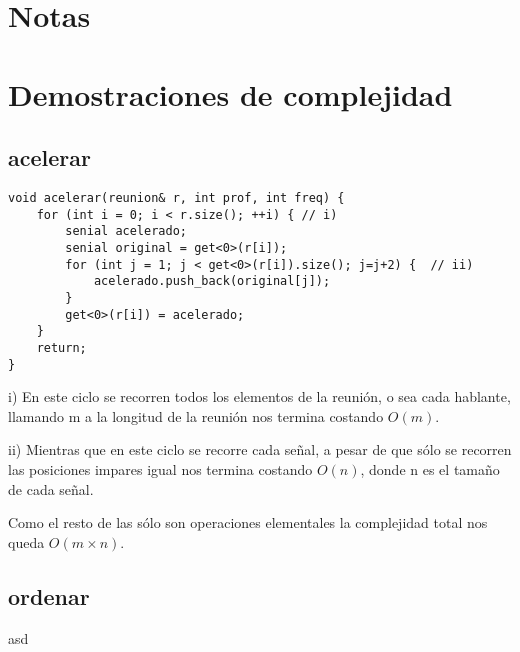 \documentclass{article}
\begin{document}
\maketitle

\tableofcontents
\newpage



\section*{Notas}
\vspace{0.5cm}


\newpage
{}
\section*{Demostraciones de complejidad}
\vspace{0.5cm}
\subsection{acelerar}
\begin{lstlisting}
void acelerar(reunion& r, int prof, int freq) {
    for (int i = 0; i < r.size(); ++i) { // i)
        senial acelerado;
        senial original = get<0>(r[i]);
        for (int j = 1; j < get<0>(r[i]).size(); j=j+2) {  // ii)
            acelerado.push_back(original[j]);
        }
        get<0>(r[i]) = acelerado;
    }
    return; 
}
\end{lstlisting}
i) En este ciclo se recorren todos los elementos de la reunión, o sea cada hablante, llamando m a la longitud de la reunión nos termina costando $O(m)$.

ii) Mientras que en este ciclo se recorre cada señal, a pesar de que sólo se recorren las posiciones impares igual nos termina costando $O(n)$, donde n es el tamaño de cada señal.

Como el resto de las sólo son operaciones elementales la complejidad total nos queda $O(m \times n)$.

\subsection{ordenar}
asd
\end{document}
